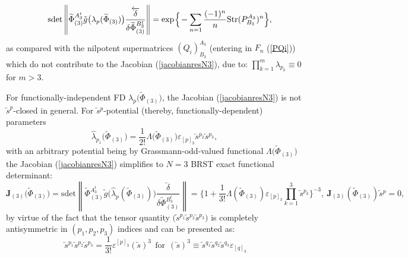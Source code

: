 \documentclass[10pt]{article}
\begin{document}
\begin{eqnarray}
&&\mathrm{sdet}\left\|\widetilde{\Phi}{}^{A^t_3}_{(3)}\tilde{g}\big(\lambda_p(\widetilde{\Phi}_{(3)})\big)\frac{\overleftarrow{\delta}}{\delta \widetilde{\Phi}{}^{B^t_3}_{(3)}} \right\| =\exp \hspace{%
-0.1em}\Big\{\hspace{-0.1em}-\sum_{n=1}\frac{(-1)^{n}}{n}\mathrm{Str}%
(P_{B_3}^{A_3})^{n}\Big\},  \label{jacobianN3res}
\end{eqnarray}%
as compared  with  the nilpotent  supermatrices  $(Q_i)_{B_{3}}^{A_{3}}$  (entering in $F_n$ (\ref{PQi})) which do not contribute  to the Jacobian (\ref{jacobianresN3}), due to: $\prod_{k=1}^m \lambda_{p_k} \equiv 0$ for $m>3$.

For functionally-independent FD $\lambda_p\big(\widetilde{\Phi}_{(3)}\big)$, the Jacobian
(\ref{jacobianresN3}) is not $\overleftarrow{s}^p$-closed in general. For $\overleftarrow{s}{}^p$-potential (thereby, functionally-dependent)  parameters
\begin{equation}
\hat{\lambda}_{p_1}\big(\widetilde{\Phi}_{(3)}\big)=\frac{1}{2!}\Lambda \big(\widetilde{\Phi}_{(3)}\big)\varepsilon
_{[p]_3}\overleftarrow{s}{}^{p_2}
\overleftarrow{s}{}^{p_3},\
\label{fdepparam}
\end{equation}%
with an arbitrary potential being by  Grassmann-odd-valued functional $\Lambda\big(\widetilde{\Phi}_{(3)}\big)$
the Jacobian (\ref{jacobianresN3}) simplifies to $N=3$ BRST exact functional determinant:
\begin{equation}
\mathbf{J}_{(3)}\big(\widetilde{\Phi}_{(3)}\big) = \mathrm{sdet}\left\|\widetilde{\Phi}{}^{A^t_3}_{(3)}\tilde{g}\big(\hat{\lambda}_p(\widetilde{\Phi}_{(3)})\big)\frac{\overleftarrow{\delta}}{\delta \widetilde{\Phi}{}^{B^t_3}_{(3)}} \right\| =  \Big\{1 + \frac{1}{3!}\Lambda (\widetilde{\Phi}_{(3)})\varepsilon
_{[p]_3}\prod_{k=1}^3\overleftarrow{s}{}^{p_k}\Big\}^{-3}, \ \mathbf{J}_{(3)}(\widetilde{\Phi}_{(3)})\overleftarrow{s}{}^p = 0,
\label{jacobianresN3fd}
\end{equation}%
by virtue of the fact that the tensor quantity $\big(\overleftarrow{s}{}^{p_1}\overleftarrow{s}{}^{p_2}
\overleftarrow{s}{}^{p_3}\big)$ is  completely antisymmetric in  $(p_1,p_2,p_3)$  indices and can be presented as:
\begin{equation}\label{s3pres}
  \overleftarrow{s}{}^{p_1}\overleftarrow{s}{}^{p_2}
\overleftarrow{s}{}^{p_3} = \frac{1}{3!}\varepsilon
^{[p]_3} \left(\overleftarrow{s}\right)^3 \ \ \mathrm{for} \ \  \left(\overleftarrow{s}\right)^3 \equiv     \overleftarrow{s}{}^{q_1}\overleftarrow{s}{}^{q_2}
\overleftarrow{s}{}^{q_3}\varepsilon
_{[q]_3}
\end{equation}
\end{document}
